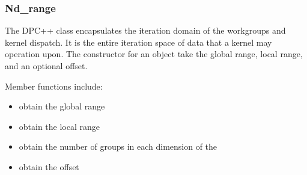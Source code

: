 \documentclass[letterpaper,10pt,english]{sphinxmanual}
\begin{document}
\begin{fulllineitems}
\begin{fulllineitems}
\pysigstopmultiline{}\label{\detokenize{programming-interface/parallelism/range:_CPPv4N5rangeeOERK5rangeRK6size_t}}%
\pysigstartmultiline
{}%
\pysigstopmultiline
\end{fulllineitems}


\end{fulllineitems}



\subsubsection{Nd\_range}
\label{\detokenize{programming-interface/parallelism/nd-range:nd-range}}\label{\detokenize{programming-interface/parallelism/nd-range:id1}}\label{\detokenize{programming-interface/parallelism/nd-range::doc}}
The DPC++  class encapsulates the iteration domain of the
work\sphinxhyphen{}groups and kernel dispatch. It is the entire iteration space of
data that a kernel may operation upon. The constructor for an
 object take the global range, local range, and an optional
offset.

Member functions include:
\begin{itemize}
\item {} 
 \textendash{} obtain the global range

\item {} 
 \textendash{} obtain the local range

\item {} 
 \textendash{} obtain the number of groups in each dimension
of the 

\item {} 
 \textendash{} obtain the offset

\end{itemize}
\end{document}
